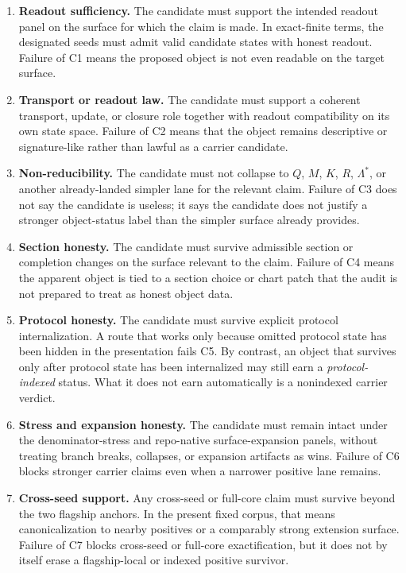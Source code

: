 \documentclass[11pt]{article}
\theoremstyle{definition}
\begin{document}
\begin{enumerate}[label=\textbf{C\arabic*.},leftmargin=*,itemsep=0.6em]
\item \textbf{Readout sufficiency.} The candidate must support the intended readout panel
on the surface for which the claim is made. In exact-finite terms, the designated seeds
must admit valid candidate states with honest readout. Failure of C1 means the proposed
object is not even readable on the target surface.

\item \textbf{Transport or readout law.} The candidate must support a coherent transport,
update, or closure role together with readout compatibility on its own state space.
Failure of C2 means that the object remains descriptive or signature-like rather than
lawful as a carrier candidate.

\item \textbf{Non-reducibility.} The candidate must not collapse to $Q$, $M$, $K$, $R$,
$\Lambda^\ast$, or another already-landed simpler lane for the relevant claim. Failure
of C3 does not say the candidate is useless; it says the candidate does not justify a
stronger object-status label than the simpler surface already provides.

\item \textbf{Section honesty.} The candidate must survive admissible section or
completion changes on the surface relevant to the claim. Failure of C4 means the
apparent object is tied to a section choice or chart patch that the audit is not
prepared to treat as honest object data.

\item \textbf{Protocol honesty.} The candidate must survive explicit protocol
internalization. A route that works only because omitted protocol state has been hidden
in the presentation fails C5. By contrast, an object that survives only after protocol
state has been internalized may still earn a \emph{protocol-indexed} status. What it
does not earn automatically is a nonindexed carrier verdict.

\item \textbf{Stress and expansion honesty.} The candidate must remain intact under the
denominator-stress and repo-native surface-expansion panels, without treating branch
breaks, collapses, or expansion artifacts as wins. Failure of C6 blocks stronger
carrier claims even when a narrower positive lane remains.

\item \textbf{Cross-seed support.} Any cross-seed or full-core claim must survive beyond
the two flagship anchors. In the present fixed corpus, that means canonicalization to
nearby positives or a comparably strong extension surface. Failure of C7 blocks
cross-seed or full-core exactification, but it does not by itself erase a flagship-local
or indexed positive survivor.
\end{enumerate}
\end{document}
